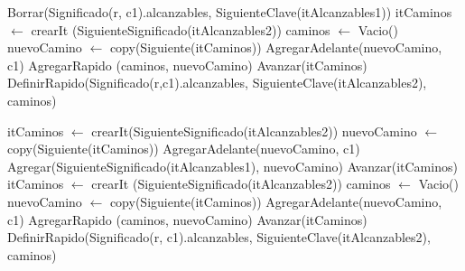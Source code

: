 \begin{Algoritmos}
\begin{algorithm}
\begin{algorithmic}[0]
			  
				\State Borrar(Significado(r, c1).alcanzables, SiguienteClave(itAlcanzables1)) 
				\State itCaminos $\gets$ crearIt (SiguienteSignificado(itAlcanzables2)) 
				\State caminos $\gets$ Vacio()  
				 
					\State nuevoCamino $\gets$ copy(Siguiente(itCaminos))  
					\State AgregarAdelante(nuevoCamino, c1) 
					\State AgregarRapido (caminos, nuevoCamino) 
					\State Avanzar(itCaminos) 
				\EndWhile  {}
				\State DefinirRapido(Significado(r,c1).alcanzables, SiguienteClave(itAlcanzables2), caminos) 
			
			\Else 
				 
					\State itCaminos $\gets$ crearIt(SiguienteSignificado(itAlcanzables2)) 
					 
						\State nuevoCamino $\gets$ copy(Siguiente(itCaminos))  
						\State AgregarAdelante(nuevoCamino, c1) 
						\State Agregar(SiguienteSignificado(itAlcanzables1), nuevoCamino) 
						\State Avanzar(itCaminos) 
					\EndWhile  {}
				\EndIf
			\EndIf
		\Else
			\State itCaminos $\gets$ crearIt (SiguienteSignificado(itAlcanzables2)) 
			\State caminos $\gets$ Vacio()  
				\State nuevoCamino $\gets$ copy(Siguiente(itCaminos))  
				\State AgregarAdelante(nuevoCamino, c1) 
				\State AgregarRapido (caminos, nuevoCamino)
				\State Avanzar(itCaminos) 
			\EndWhile  {}
			\State DefinirRapido(Significado(r, c1).alcanzables, SiguienteClave(itAlcanzables2), caminos)
		\EndIf
		

\end{algorithmic}
\end{algorithm}
\end{Algoritmos}
